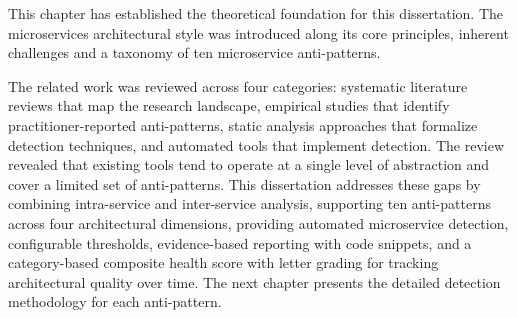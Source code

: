\par This chapter has established the theoretical foundation for this dissertation. The microservices architectural style was introduced along its core principles, inherent challenges and a taxonomy of ten microservice anti-patterns.

The related work was reviewed across four categories: systematic literature reviews that map the research landscape, empirical studies that identify practitioner-reported anti-patterns, static analysis approaches that formalize detection techniques, and automated tools that implement detection. The review revealed that existing tools tend to operate at a single level of abstraction and cover a limited set of anti-patterns. This dissertation addresses these gaps by combining intra-service and inter-service analysis, supporting ten anti-patterns across four architectural dimensions, providing automated microservice detection, configurable thresholds, evidence-based reporting with code snippets, and a category-based composite health score with letter grading for tracking architectural quality over time. The next chapter presents the detailed detection methodology for each anti-pattern.
